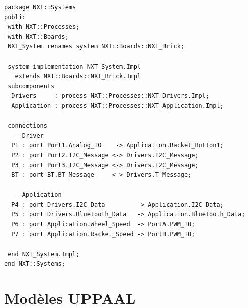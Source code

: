 
\begin{lstlisting}
package NXT::Systems
public
 with NXT::Processes;
 with NXT::Boards;
 NXT_System renames system NXT::Boards::NXT_Brick;
 
 system implementation NXT_System.Impl
   extends NXT::Boards::NXT_Brick.Impl
 subcomponents
  Drivers     : process NXT::Processes::NXT_Drivers.Impl;
  Application : process NXT::Processes::NXT_Application.Impl;
  
 connections
  -- Driver
  P1 : port Port1.Analog_IO    -> Application.Racket_Button1;
  P2 : port Port2.I2C_Message <-> Drivers.I2C_Message;
  P3 : port Port3.I2C_Message <-> Drivers.I2C_Message;
  BT : port BT.BT_Message     <-> Drivers.T_Message;
  
  -- Application
  P4 : port Drivers.I2C_Data         -> Application.I2C_Data;
  P5 : port Drivers.Bluetooth_Data   -> Application.Bluetooth_Data;
  P6 : port Application.Wheel_Speed  -> PortA.PWM_IO;
  P7 : port Application.Racket_Speed -> PortB.PWM_IO;
     
 end NXT_System.Impl;
end NXT::Systems;
\end{lstlisting}

  \newpage
  \section{Modèles UPPAAL}
  \label{ann:uppaal}
  
